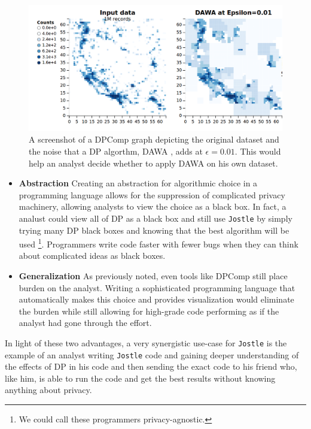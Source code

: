\documentclass[11pt]{article}
\newcommand{\Jostle}{\texttt{Jostle}}
\begin{document}
\begin{figure}
\begin{center}
\includegraphics[scale=0.3]{DPComp}
\end{center}
\caption{A screenshot of a DPComp graph depicting the original dataset and the noise that a DP algorthm, DAWA \cite{Li:2014}, adds at $\epsilon=0.01$. This would help an analyst decide whether to apply DAWA on his own dataset.}\label{fig:dpcomp}
\end{figure}
\begin{itemize}
\item \textbf{Abstraction} Creating an abstraction for algorithmic choice in a programming language allows for the suppression of complicated privacy machinery, allowing analysts to view the choice as a black box. In fact, a analust could view all of DP as a black box and still use \Jostle{} by simply trying many DP black boxes and knowing that the best algorithm will be used \footnote{We could call these programmers privacy-agnostic.}. Programmers write code faster with fewer bugs when they can think about complicated ideas as black boxes.
\item \textbf{Generalization} As previously noted, even tools like DPComp still place burden on the analyst. Writing a sophisticated programming language that automatically makes this choice and provides visualization would eliminate the burden while still allowing for high-grade code performing as if the analyst had gone through the effort.
\end{itemize}

In light of these two advantages, a very synergistic use-case for \Jostle{} is the example of an analyst writing \Jostle{} code and gaining deeper understanding of the effects of DP in his code and then sending the exact code to his friend who, like him, is able to run the code and get the best results without knowing anything about privacy.
\end{document}
